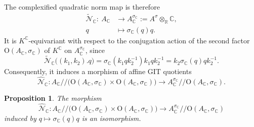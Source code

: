 \documentclass[oneside,11pt]{amsart}
\newtheorem{prop}[thm]{Proposition}
\theoremstyle{definition}
\theoremstyle{remark}
\numberwithin{thm}{section}
\numberwithin{equation}{section}
\begin{document}
The complexified quadratic norm map is therefore
\begin{align*}
\tilde{\mathcal N}_{\mathbb{C}}:\ 
A_{\mathbb{C}} &\longrightarrow A_{\mathbb{C}}^{\sigma_{\mathbb{C}}}:=A^\sigma\otimes_{\mathbb R}\mathbb{C},\\
q &\longmapsto \sigma_{\mathbb{C}}(q)q.
\end{align*}
It is $K^{\mathbb{C}}$-equivariant with respect to the conjugation action of the second factor $\mathrm{O}(A_{\mathbb{C}},\sigma_{\mathbb{C}})$ of $K^{\mathbb{C}}$ on $A_{\mathbb{C}}^{\sigma_{\mathbb{C}}}$, since
\[
\tilde{\mathcal N}_{\mathbb{C}}\bigl((k_1,k_2).q\bigr)=\sigma_{\mathbb{C}}(k_1qk_2^{-1})k_1qk_2^{-1}=k_2\sigma_{\mathbb{C}}(q)qk_2^{-1}.
\]
Consequently, it induces a morphism of affine GIT quotients
\[
\hat{\mathcal N}_{\mathbb{C}}: A_{\mathbb{C}}/\!\!/\bigl(\mathrm{O}(A_{\mathbb{C}},\sigma_{\mathbb{C}})\times
\mathrm{O}(A_{\mathbb{C}},\sigma_{\mathbb{C}})\bigr)
\longrightarrow
A_{\mathbb{C}}^{\sigma_{\mathbb{C}}}/\!\!/\mathrm{O}(A_{\mathbb{C}},\sigma_{\mathbb{C}}).
\]

\begin{prop}
The morphism
\[
\hat{\mathcal N}_{\mathbb{C}}: A_{\mathbb{C}}/\!\!/\bigl(\mathrm{O}(A_{\mathbb{C}},\sigma_{\mathbb{C}})\times
\mathrm{O}(A_{\mathbb{C}},\sigma_{\mathbb{C}})\bigr)\longrightarrow A_{\mathbb{C}}^{\sigma_{\mathbb{C}}}/\!\!/\mathrm{O}(A_{\mathbb{C}},\sigma_{\mathbb{C}})
\]
induced by $q\mapsto \sigma_{\mathbb{C}}(q)q$ is an isomorphism.
\end{prop}
\end{document}
